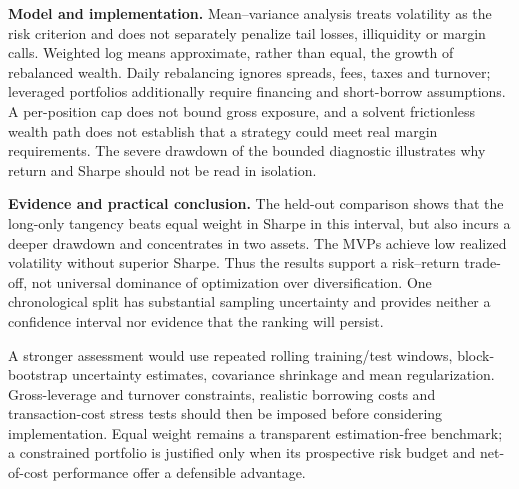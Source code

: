 \documentclass[10pt,a4paper]{article}
\begin{document}
\textbf{Model and implementation.} Mean--variance analysis treats volatility as the risk criterion and does not separately penalize tail losses, illiquidity or margin calls. Weighted log means approximate, rather than equal, the growth of rebalanced wealth. Daily rebalancing ignores spreads, fees, taxes and turnover; leveraged portfolios additionally require financing and short-borrow assumptions. A per-position cap does not bound gross exposure, and a solvent frictionless wealth path does not establish that a strategy could meet real margin requirements. The severe drawdown of the bounded diagnostic illustrates why return and Sharpe should not be read in isolation.

\textbf{Evidence and practical conclusion.} The held-out comparison shows that the long-only tangency beats equal weight in Sharpe in this interval, but also incurs a deeper drawdown and concentrates in two assets. The MVPs achieve low realized volatility without superior Sharpe. Thus the results support a risk--return trade-off, not universal dominance of optimization over diversification. One chronological split has substantial sampling uncertainty and provides neither a confidence interval nor evidence that the ranking will persist.

A stronger assessment would use repeated rolling training/test windows, block-bootstrap uncertainty estimates, covariance shrinkage and mean regularization. Gross-leverage and turnover constraints, realistic borrowing costs and transaction-cost stress tests should then be imposed before considering implementation. Equal weight remains a transparent estimation-free benchmark; a constrained portfolio is justified only when its prospective risk budget and net-of-cost performance offer a defensible advantage.
\end{document}
